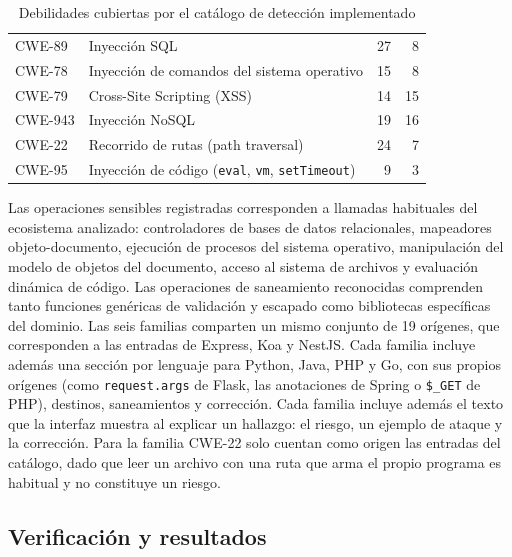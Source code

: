 \begin{table}[H]
    \centering
    \caption{Debilidades cubiertas por el catálogo de detección implementado}
    \label{tab:catalogo}
    \small
    \begin{tabularx}{\textwidth}{l L r r}
        \toprule
         &  &  &  \\
        \midrule
        CWE-89 & Inyección SQL & 27 & 8 \\
        CWE-78 & Inyección de comandos del sistema operativo & 15 & 8 \\
        CWE-79 & Cross-Site Scripting (XSS) & 14 & 15 \\
        CWE-943 & Inyección NoSQL & 19 & 16 \\
        CWE-22 & Recorrido de rutas (path traversal) & 24 & 7 \\
        CWE-95 & Inyección de código (\texttt{eval}, \texttt{vm}, \texttt{setTimeout}) & 9 & 3 \\
        \bottomrule
    \end{tabularx}
\end{table}

Las operaciones sensibles registradas corresponden a llamadas habituales del ecosistema analizado: controladores de bases de datos relacionales, mapeadores objeto-documento, ejecución de procesos del sistema operativo, manipulación del modelo de objetos del documento, acceso al sistema de archivos y evaluación dinámica de código. Las operaciones de saneamiento reconocidas comprenden tanto funciones genéricas de validación y escapado como bibliotecas específicas del dominio. Las seis familias comparten un mismo conjunto de 19 orígenes, que corresponden a las entradas de Express, Koa y NestJS. Cada familia incluye además una sección por lenguaje para Python, Java, PHP y Go, con sus propios orígenes (como \texttt{request.args} de Flask, las anotaciones de Spring o \texttt{\$\_GET} de PHP), destinos, saneamientos y corrección. Cada familia incluye además el texto que la interfaz muestra al explicar un hallazgo: el riesgo, un ejemplo de ataque y la corrección. Para la familia CWE-22 solo cuentan como origen las entradas del catálogo, dado que leer un archivo con una ruta que arma el propio programa es habitual y no constituye un riesgo.

\subsection{Verificación y resultados}\label{sec:n4.2.4}

